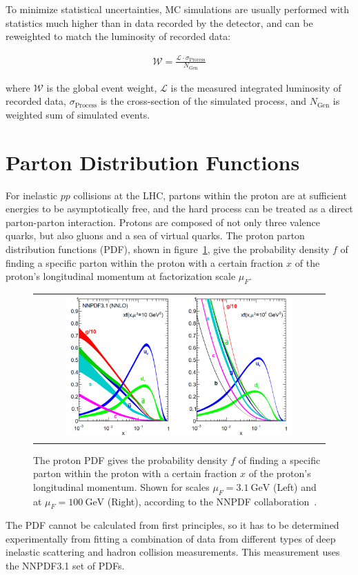 To minimize statistical uncertainties, MC simulations are usually performed with statistics much higher than in data recorded by the detector, and can be reweighted to match the luminosity of recorded data:
\begin{linenomath*}
\begin{align}
\mathcal{W} = \frac{\mathcal{L} \cdot \sigma_{\text{Process}}}{N_{\text{Gen}}}
\end{align}
\end{linenomath*}
where $\mathcal{W}$ is the global event weight, $\mathcal{L}$ is the measured integrated luminosity of recorded data, $\sigma_{\text{Process}}$ is the cross-section of the simulated process, and $N_{\text{Gen}}$ is weighted sum of simulated events.

\section{Parton Distribution Functions}
For inelastic $pp$ collisions at the LHC, partons within the proton are at sufficient energies to be asymptotically free, and the hard process can be treated as a direct parton-parton interaction.
Protons are composed of not only three valence quarks, but also gluons and a sea of virtual quarks.
The proton parton distribution functions (PDF), shown in figure~\ref{Parton_Distribution_Functions}, give the probability density $f$ of finding a specific parton within the proton with a certain fraction $x$ of the proton's longitudinal momentum at factorization scale $\mu_F$.
\begin{figure}[!htb]
  \begin{center}
    \begin{tabular}{c}
        \includegraphics[width=0.80\textwidth]{fig_Event_Simulation/Parton_Distribution_Functions.png}
    \end{tabular}
    \caption{The proton PDF gives the probability density $f$ of finding a specific parton within the proton with a certain fraction $x$ of the proton's longitudinal momentum.
    Shown for scales $\mu_F = \SI{3.1}{\GeV}$ (Left) and at $\mu_F = \SI{100}{\GeV}$ (Right), according to the NNPDF collaboration~\cite{Ball:2267455}.
            }
    \label{Parton_Distribution_Functions}
  \end{center}
\end{figure}
The PDF cannot be calculated from first principles, so it has to be determined experimentally from fitting a combination of data from different types of deep inelastic scattering and hadron collision measurements.
This measurement uses the NNPDF3.1 set of PDFs.

